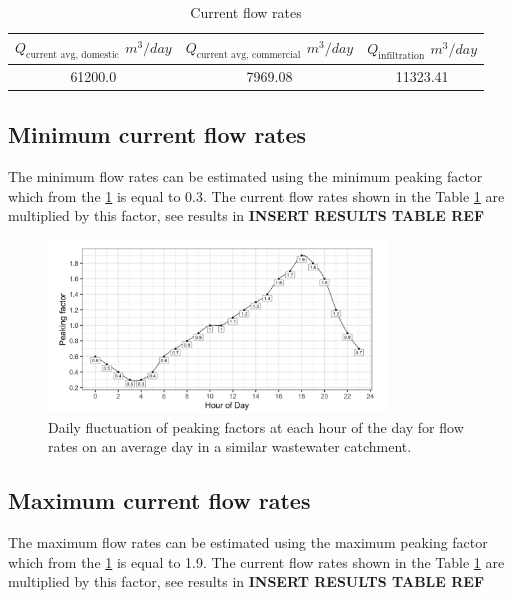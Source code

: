 \documentclass[12pt]{article}
\begin{document}
\begin{table}[h]
  \centering
  \begin{tabular}{|c|c|c|}
  \hline
  $Q_{\text{current avg, domestic}}$ $m^3/day$ & $Q_{\text{current avg, commercial}}$ $m^3/day$ & $Q_{\text{infiltration}}$ $m^3/day$ \\
  \hline
  61200.0 & 7969.08 & 11323.41 \\
  \hline
  \end{tabular}
  \caption{Current flow rates}
  \label{tab:current_flows}
\end{table}

\subsection{Minimum current flow rates}

The minimum flow rates can be estimated using the minimum peaking factor
which from the \ref{fig:peaking_factor} is equal to 0.3. The current flow rates shown in the Table \ref{tab:current_flows}
are multiplied by this factor, see results in \textbf{INSERT RESULTS TABLE REF}

\begin{figure}[h]
  \centering
  \includegraphics[width=0.8\textwidth]{../images/peaking_factor.png}
  \caption{Daily fluctuation of peaking factors at each hour of the day for flow rates on an average day in a similar wastewater catchment.}
  \label{fig:peaking_factor}
\end{figure}

\subsection{Maximum current flow rates}

The maximum flow rates can be estimated using the maximum peaking factor
which from the \ref{fig:peaking_factor} is equal to 1.9. The current flow rates shown in the Table \ref{tab:current_flows}
are multiplied by this factor, see results in \textbf{INSERT RESULTS TABLE REF} 
\end{document}
